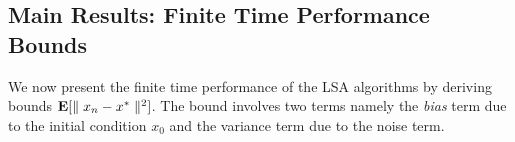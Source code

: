 \subsection{Main Results: Finite Time Performance Bounds}
We now present the finite time performance of the LSA algorithms by deriving bounds $\mathbf{E}[\parallel x_n-x^*\parallel^2]$. The bound involves two terms namely the \emph{bias} term due to the initial condition $x_0$ and the variance term due to the noise term. 

